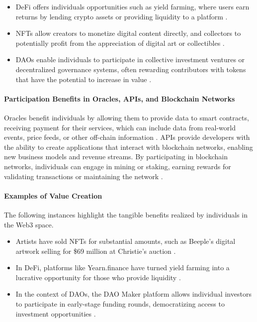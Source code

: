 \documentclass{article}
\begin{document}
\begin{itemize}
    \item DeFi offers individuals opportunities such as yield farming, where users earn returns by lending crypto assets or providing liquidity to a platform \cite{schar2021defi}. 
    \item NFTs allow creators to monetize digital content directly, and collectors to potentially profit from the appreciation of digital art or collectibles \cite{nadini2021nft}. 
    \item DAOs enable individuals to participate in collective investment ventures or decentralized governance systems, often rewarding contributors with tokens that have the potential to increase in value \cite{wang2019blockchainenabled}.
\end{itemize}

\paragraph{Participation Benefits in Oracles, APIs, and Blockchain Networks} Oracles benefit individuals by allowing them to provide data to smart contracts, receiving payment for their services, which can include data from real-world events, price feeds, or other off-chain information \cite{ellis2017chainlink}. APIs provide developers with the ability to create applications that interact with blockchain networks, enabling new business models and revenue streams. By participating in blockchain networks, individuals can engage in mining or staking, earning rewards for validating transactions or maintaining the network \cite{bonneau2015sok}.

\paragraph{Examples of Value Creation} The following instances highlight the tangible benefits realized by individuals in the Web3 space. 

\begin{itemize}
    \item Artists have sold NFTs for substantial amounts, such as Beeple's digital artwork selling for \$69 million at Christie's auction \cite{christies2021beeple}. 
    \item In DeFi, platforms like Yearn.finance have turned yield farming into a lucrative opportunity for those who provide liquidity \cite{evans2020defi}. 
    \item In the context of DAOs, the DAO Maker platform allows individual investors to participate in early-stage funding rounds, democratizing access to investment opportunities \cite{daomaker2021}.
\end{itemize}
\end{document}
